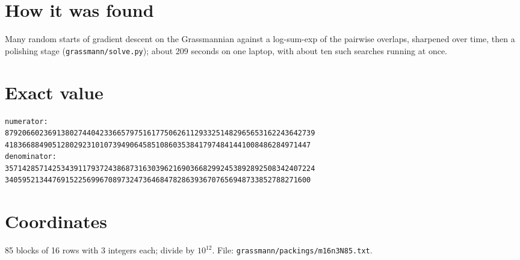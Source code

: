\documentclass[11pt,a4paper]{article}
\begin{document}
\section{How it was found}
Many random starts of gradient descent on the Grassmannian against a log-sum-exp of the pairwise overlaps, sharpened over time, then a polishing stage (\texttt{grassmann/solve.py}); about 209 seconds on one laptop, with about ten such searches running at once.


\appendix
\section{Exact value}
{\small
\begin{verbatim}
numerator:
879206602369138027440423366579751617750626112933251482965653162243642739
41836688490512802923101073949064585108603538417974841441008486284971447
denominator:
357142857142534391179372438687316303962169036682992453892892508342407224
34059521344769152256996708973247364684782863936707656948733852788271600
\end{verbatim}}

\section{Coordinates}
85 blocks of 16 rows with 3 integers each; divide by $10^{12}$. File: \texttt{grassmann/packings/m16n3N85.txt}.
{\tiny
\begin{multicols}{3}
\end{multicols}}
\end{document}
